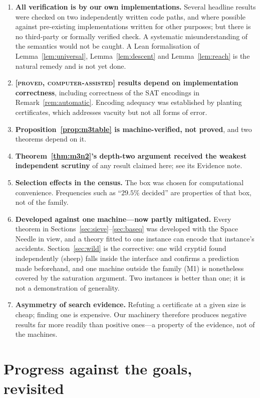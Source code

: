 \documentclass[11pt]{article}
\theoremstyle{definition}
\theoremstyle{remark}
\newcommand{\CAP}{\textsc{[proved, computer-assisted]}}
\begin{document}
\begin{enumerate}
\item \textbf{All verification is by our own implementations.}  Several
  headline results were checked on two independently written code paths, and
  where possible against pre-existing implementations written for other
  purposes; but there is no third-party or formally verified check.  A
  systematic misunderstanding of the semantics would not be caught.  A Lean
  formalisation of Lemma~\ref{lem:universal}, Lemma~\ref{lem:descent} and
  Lemma~\ref{lem:reach} is the natural remedy and is not yet done.
\item \textbf{\CAP{} results depend on implementation correctness}, including
  correctness of the SAT encodings in Remark~\ref{rem:automatic}.  Encoding
  adequacy was established by planting certificates, which addresses vacuity
  but not all forms of error.
\item \textbf{Proposition~\ref{prop:m3table} is machine-verified, not proved},
  and two theorems depend on it.
\item \textbf{Theorem~\ref{thm:m3n2}'s depth-two argument received the weakest
  independent scrutiny} of any result claimed here; see its Evidence note.
\item \textbf{Selection effects in the census.}  The box was chosen for
  computational convenience.  Frequencies such as ``$29.5\%$ decided'' are
  properties of that box, not of the family.
\item \textbf{Developed against one machine---now partly mitigated.}  Every
  theorem in Sections~\ref{sec:sieve}--\ref{sec:baseq} was developed with the
  Space Needle in view, and a theory fitted to one instance can encode that
  instance's accidents.  Section~\ref{sec:wild} is the corrective: one wild
  cryptid found independently (sheep) falls inside the interface and confirms
  a prediction made beforehand, and one machine outside the family
  (M1) is nonetheless covered by the saturation argument.  Two instances is
  better than one; it is not a demonstration of generality.
\item \textbf{Asymmetry of search evidence.}  Refuting a certificate at a
  given size is cheap; finding one is expensive.  Our machinery therefore
  produces negative results far more readily than positive ones---a property
  of the evidence, not of the machines.
\end{enumerate}

\section{Progress against the goals, revisited}
\label{sec:goals-revisited}
\end{document}
